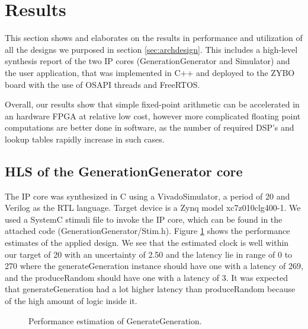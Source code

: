 \section{Results}\label{sec:results}

This section shows and elaborates on the results in performance and utilization of all the designs we purposed in section \ref{sec:archdesign}. This includes a high-level synthesis report of the two IP cores (GenerationGenerator and Simulator) and the user application, that was implemented in C++ and deployed to the ZYBO board with the use of OSAPI threads and FreeRTOS. 

Overall, our results show that simple fixed-point arithmetic can be accelerated in an hardware FPGA at relative low cost, however more complicated floating point computations are better done in software, as the number of required DSP's and lookup tables rapidly increase in such cases.

\subsection{HLS of the GenerationGenerator core}

The IP core was synthesized in C using a VivadoSimulator, a period of 20 and Verilog as the RTL language. Target device is a Zynq model xc7z010clg400-1. We used a SystemC stimuli file to invoke the IP core, which can be found in the attached code (GenerationGenerator/Stim.h). Figure \ref{fig:ggperformanceestimates} shows the performance estimates of the applied design. We see that the estimated clock is well within our target of 20 with an uncertainty of 2.50 and the latency lie in range of 0 to 270 where the generateGeneration instance should have one with a latency of 269, and the produceRandom should have one with a latency of 3. It was expected that generateGeneration had a lot higher latency than produceRandom because of the high amount of logic inside it.

\begin{figure}[h!]
	\centering
	\caption{Performance estimation of GenerateGeneration.}
	\label{fig:ggperformanceestimates}
\end{figure}

